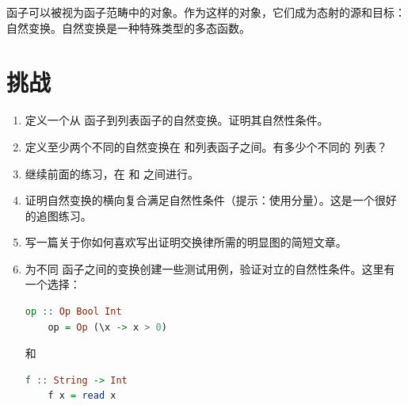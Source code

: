 函子可以被视为函子范畴中的对象。作为这样的对象，它们成为态射的源和目标：自然变换。自然变换是一种特殊类型的多态函数。

\section{挑战}

\begin{enumerate}
  \tightlist
  \item
  定义一个从  函子到列表函子的自然变换。证明其自然性条件。
  \item
  定义至少两个不同的自然变换在  和列表函子之间。有多少个不同的 \code{()} 列表？
  \item
  继续前面的练习，在  和  之间进行。
  \item
  证明自然变换的横向复合满足自然性条件（提示：使用分量）。这是一个很好的追图练习。
  \item
  写一篇关于你如何喜欢写出证明交换律所需的明显图的简短文章。
  \item
  为不同  函子之间的变换创建一些测试用例，验证对立的自然性条件。这里有一个选择：

  \begin{lstlisting}[language=Haskell]
    op :: Op Bool Int
    op = Op (\x -> x > 0)
  \end{lstlisting}
  和

  \begin{lstlisting}[language=Haskell]
    f :: String -> Int
    f x = read x
  \end{lstlisting}
\end{enumerate}
